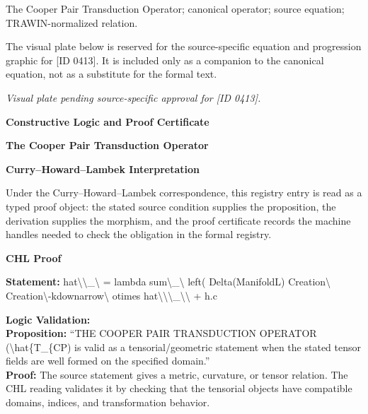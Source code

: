 The Cooper Pair Transduction Operator; canonical operator; source equation; TRAWIN-normalized relation.
\endgroup

\begingroup\footnotesize\sloppy
The visual plate below is reserved for the source-specific equation and progression graphic for [ID 0413]. It is included only as a companion to the canonical equation, not as a substitute for the formal text.
\par\endgroup
\begingroup\footnotesize\itshape
Visual plate pending source-specific approval for [ID 0413].
\par\endgroup

\clearpage
\begingroup\tzpsupportsetup
\noindent\textbf{\fontsize{10.8pt}{12.8pt}\selectfont [ID 0413] Constructive Logic and Proof Certificate}\par
\noindent\textbf{\fontsize{10pt}{12pt}\selectfont The Cooper Pair Transduction Operator}\par
\vspace{0.45em}
\begingroup
\footnotesize
\setlength{\parskip}{0.22em}
\setlength{\parindent}{0pt}
\noindent\textbf{Curry--Howard--Lambek Interpretation}\par
Under the Curry--Howard--Lambek correspondence, this registry entry is read as a typed proof
object: the stated source condition supplies the proposition, the derivation supplies the
morphism, and the proof certificate records the machine handles needed to check the obligation
in the formal registry.

\vspace{0.45em}
\noindent\textbf{CHL Proof}\par
\textbf{Statement:} hat\textbackslash{}\textbackslash{}\_\textbackslash{} = lambda sum\textbackslash{}\_\textbackslash{} left( Delta(ManifoldL) Creation\textbackslash{} Creation\textbackslash{}-kdownarrow\textbackslash{} otimes
hat\textbackslash{}\textbackslash{}\textbackslash{}\_\textbackslash{}\textbackslash{} + h.c

\textbf{Logic Validation:}\\
\textbf{Proposition:} ``THE COOPER PAIR TRANSDUCTION OPERATOR (\textbackslash{}hat\{T\_\{CP) is valid as a tensorial/geometric
statement when the stated tensor fields are well formed on the specified domain.''\\
\textbf{Proof:} The source statement gives a metric, curvature, or tensor relation. The CHL reading
validates it by checking that the tensorial objects have compatible domains, indices,
and transformation behavior.

